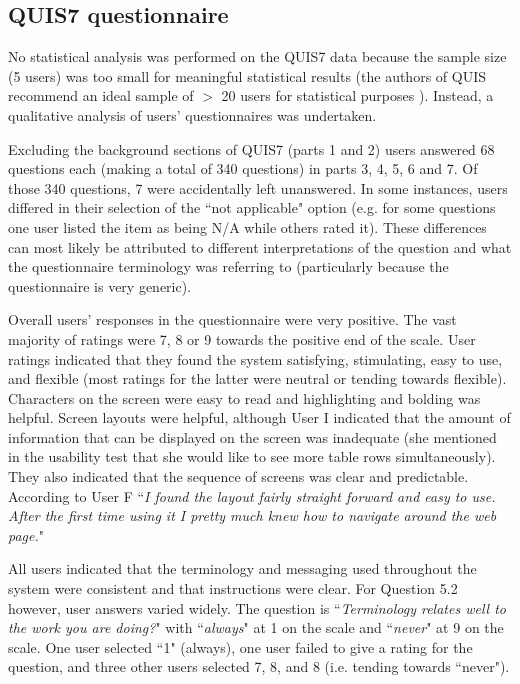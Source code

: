 \subsection{QUIS7 questionnaire}
No statistical analysis was performed on the QUIS7 data because the sample size (5 users) was too small for meaningful statistical results (the authors of QUIS recommend an ideal sample of $>$ 20 users for statistical purposes \citep{QUISquant}). Instead, a qualitative analysis of users' questionnaires was undertaken. 

Excluding the background sections of QUIS7 (parts 1 and 2) users answered 68 questions each (making a total of 340 questions) in parts 3, 4, 5, 6 and 7. Of those 340 questions, 7 were accidentally left unanswered. In some instances, users differed in their selection of the ``not applicable" option (e.g. for some questions one user listed the item as being N/A while others rated it). These differences can most likely be attributed to different interpretations of the question and what the questionnaire terminology was referring to (particularly because the questionnaire is very generic).

Overall users' responses in the questionnaire were very positive. The vast majority of ratings were 7, 8 or 9 towards the positive end of the scale.  User ratings indicated that they found the system satisfying, stimulating, easy to use, and flexible (most ratings for the latter were neutral or tending towards flexible). Characters on the screen were easy to read and highlighting and bolding was helpful. Screen layouts were helpful, although User I indicated that the amount of information that can be displayed on the screen was inadequate (she mentioned in the usability test that she would like to see more table rows simultaneously). They also indicated that the sequence of screens was clear and predictable. According to User F ``\textit{I found the layout fairly straight forward and easy to use. After the first time using it I pretty much knew how to navigate around the web page.}"

All users indicated that the terminology and messaging used throughout the system were consistent and that instructions were clear. For Question 5.2 however, user answers varied widely. The question is ``\textit{Terminology relates well to the work you are doing?}"  with ``\textit{always}" at 1 on the scale and ``\textit{never}" at 9 on the scale. One user selected ``1" (always), one user failed to give a rating for the question, and three other users selected 7, 8, and 8 (i.e. tending towards ``never"). 

